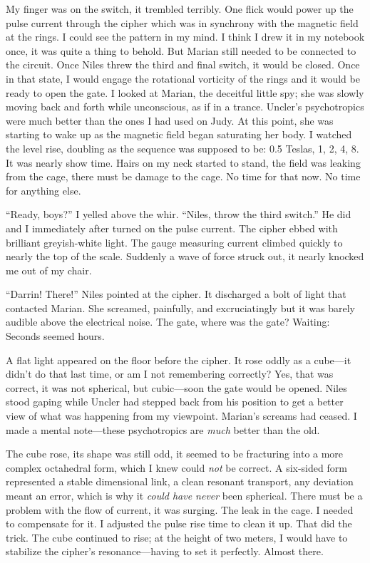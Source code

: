 My finger was on the switch, it trembled terribly. One flick would power
up the pulse current through the cipher which was in synchrony with the
magnetic field at the rings. I could see the pattern in my mind. I think
I drew it in my notebook once, it was quite a thing to behold. But
Marian still needed to be connected to the circuit. Once Niles threw the
third and final switch, it would be closed. Once in that state, I would
engage the rotational vorticity of the rings and it would be ready to
open the gate. I looked at Marian, the deceitful little spy; she was
slowly moving back and forth while unconscious, as if in a trance.
Uncler's psychotropics were much better than the ones I had used on
Judy. At this point, she was starting to wake up as the magnetic field
began saturating her body. I watched the level rise, doubling as the
sequence was supposed to be: 0.5 Teslas, 1, 2, 4, 8. It was nearly show
time. Hairs on my neck started to stand, the field was leaking from the
cage, there must be damage to the cage. No time for that now. No time
for anything else.

``Ready, boys?'' I yelled above the whir. ``Niles, throw the third
switch.'' He did and I immediately after turned on the pulse current.
The cipher ebbed with brilliant greyish-white light. The gauge measuring
current climbed quickly to nearly the top of the scale. Suddenly a wave
of force struck out, it nearly knocked me out of my chair.

``Darrin! There!'' Niles pointed at the cipher. It discharged a bolt of
light that contacted Marian. She screamed, painfully, and excruciatingly
but it was barely audible above the electrical noise. The gate, where
was the gate? Waiting: Seconds seemed hours.

A flat light appeared on the floor before the cipher. It rose oddly as a
cube---it didn't do that last time, or am I not remembering correctly?
Yes, that was correct, it was not spherical, but cubic---soon the gate
would be opened. Niles stood gaping while Uncler had stepped back from
his position to get a better view of what was happening from my
viewpoint. Marian's screams had ceased. I made a mental note---these
psychotropics are \emph{much} better than the old.

The cube rose, its shape was still odd, it seemed to be fracturing into
a more complex octahedral form, which I knew could \emph{not} be
correct. A six-sided form represented a stable dimensional link, a clean
resonant transport, any deviation meant an error, which is why it
\emph{could have never} been spherical. There must be a problem with the
flow of current, it was surging. The leak in the cage. I needed to
compensate for it. I adjusted the pulse rise time to clean it up. That
did the trick. The cube continued to rise; at the height of two meters,
I would have to stabilize the cipher's resonance---having to set it
perfectly. Almost there.

